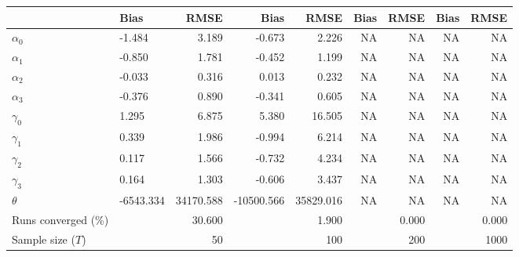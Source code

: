 
\begin{tabular}[t]{llrrrrrrr}
\toprule
  & Bias & RMSE & Bias & RMSE & Bias & RMSE & Bias & RMSE\\
\midrule
$\alpha_{0}$ & -1.484 & 3.189 & -0.673 & 2.226 & NA & NA & NA & NA\\
$\alpha_{1}$ & -0.850 & 1.781 & -0.452 & 1.199 & NA & NA & NA & NA\\
$\alpha_{2}$ & -0.033 & 0.316 & 0.013 & 0.232 & NA & NA & NA & NA\\
$\alpha_{3}$ & -0.376 & 0.890 & -0.341 & 0.605 & NA & NA & NA & NA\\
$\gamma_{0}$ & 1.295 & 6.875 & 5.380 & 16.505 & NA & NA & NA & NA\\
$\gamma_{1}$ & 0.339 & 1.986 & -0.994 & 6.214 & NA & NA & NA & NA\\
$\gamma_{2}$ & 0.117 & 1.566 & -0.732 & 4.234 & NA & NA & NA & NA\\
$\gamma_{3}$ & 0.164 & 1.303 & -0.606 & 3.437 & NA & NA & NA & NA\\
$\theta$ & -6543.334 & 34170.588 & -10500.566 & 35829.016 & NA & NA & NA & NA\\
Runs converged (\%) &  & 30.600 &  & 1.900 &  & 0.000 &  & 0.000\\
Sample size ($T$) &  & 50 &  & 100 &  & 200 &  & 1000\\
\bottomrule
\end{tabular}
